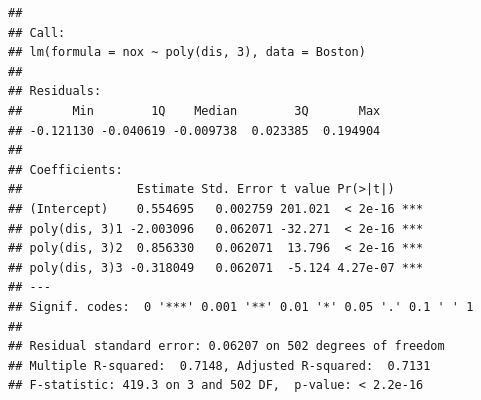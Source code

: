 \documentclass[
]{article}
\newenvironment{Shaded}{\begin{snugshade}}{\end{snugshade}}
\newcommand{\AttributeTok}[1]{\textcolor[rgb]{0.13,0.29,0.53}{#1}}
\newcommand{\CommentTok}[1]{\textcolor[rgb]{0.56,0.35,0.01}{\textit{#1}}}
\newcommand{\DecValTok}[1]{\textcolor[rgb]{0.00,0.00,0.81}{#1}}
\newcommand{\FloatTok}[1]{\textcolor[rgb]{0.00,0.00,0.81}{#1}}
\newcommand{\FunctionTok}[1]{\textcolor[rgb]{0.13,0.29,0.53}{\textbf{#1}}}
\newcommand{\NormalTok}[1]{#1}
\newcommand{\OtherTok}[1]{\textcolor[rgb]{0.56,0.35,0.01}{#1}}
\newcommand{\SpecialCharTok}[1]{\textcolor[rgb]{0.81,0.36,0.00}{\textbf{#1}}}
\newcommand{\StringTok}[1]{\textcolor[rgb]{0.31,0.60,0.02}{#1}}
\begin{document}
\begin{verbatim}
## 
## Call:
## lm(formula = nox ~ poly(dis, 3), data = Boston)
## 
## Residuals:
##       Min        1Q    Median        3Q       Max 
## -0.121130 -0.040619 -0.009738  0.023385  0.194904 
## 
## Coefficients:
##                Estimate Std. Error t value Pr(>|t|)    
## (Intercept)    0.554695   0.002759 201.021  < 2e-16 ***
## poly(dis, 3)1 -2.003096   0.062071 -32.271  < 2e-16 ***
## poly(dis, 3)2  0.856330   0.062071  13.796  < 2e-16 ***
## poly(dis, 3)3 -0.318049   0.062071  -5.124 4.27e-07 ***
## ---
## Signif. codes:  0 '***' 0.001 '**' 0.01 '*' 0.05 '.' 0.1 ' ' 1
## 
## Residual standard error: 0.06207 on 502 degrees of freedom
## Multiple R-squared:  0.7148, Adjusted R-squared:  0.7131 
## F-statistic: 419.3 on 3 and 502 DF,  p-value: < 2.2e-16
\end{verbatim}

\begin{Shaded}
\end{Shaded}
\end{document}
